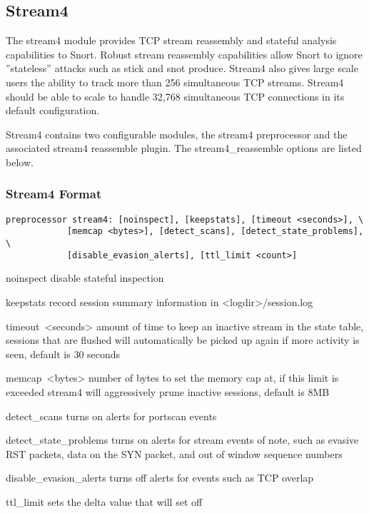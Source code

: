 \documentclass[english]{report}
\begin{document}
\subsection{Stream4\label{stream 4 section}}

The stream4 module provides TCP stream reassembly and stateful analysis
capabilities to Snort. Robust stream reassembly capabilities allow
Snort to ignore ''stateless'' attacks such as stick and snot produce.
Stream4 also gives large scale users the ability to track more than
256 simultaneous TCP streams. Stream4 should be able to scale to handle
32,768 simultaneous TCP connections in its default configuration.

Stream4 contains two configurable modules, the stream4 preprocessor
and the associated stream4 reassemble plugin. The stream4\_reassemble
options are listed below. 


\subsubsection{Stream4 Format}

\begin{verbatim}
preprocessor stream4: [noinspect], [keepstats], [timeout <seconds>], \
            [memcap <bytes>], [detect_scans], [detect_state_problems], \
            [disable_evasion_alerts], [ttl_limit <count>]
\end{verbatim}
\begin{list}{}
\item [noinspect]disable stateful inspection
\item [keepstats]record session summary information in <logdir>/session.log
\item [timeout~<seconds>]amount of time to keep an inactive stream in
the state table, sessions that are flushed will automatically be picked
up again if more activity is seen, default is 30 seconds
\item [memcap~<bytes>]number of bytes to set the memory cap at, if this
limit is exceeded stream4 will aggressively prune inactive sessions,
default is 8MB
\item [detect\_scans]turns on alerts for portscan events
\item [detect\_state\_problems]turns on alerts for stream events of note,
such as evasive RST packets, data on the SYN packet, and out of window
sequence numbers
\item [disable\_evasion\_alerts]turns off alerts for events such as TCP
overlap
\item [ttl\_limit]sets the delta value that will set off 
\end{list}
\end{document}
